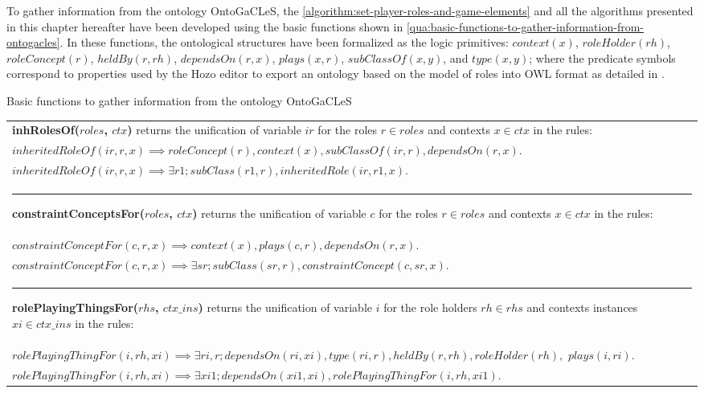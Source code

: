 To gather information from the ontology OntoGaCLeS, the \autoref{algorithm:set-player-roles-and-game-elements} and all the algorithms presented in this chapter hereafter have been developed using the basic functions shown in \autoref{qua:basic-functions-to-gather-information-from-ontogacles}.
In these functions, the ontological structures have been formalized as the logic primitives: $context(x)$, $roleHolder(rh)$, $roleConcept(r)$, $heldBy(r,rh)$, $dependsOn(r,x)$, $plays(x,r)$, $subClassOf(x,y)$, and $type(x,y)$; where the predicate symbols correspond to properties used by the Hozo editor to export an ontology based on the model of roles into OWL format as detailed in \cite{KozakiSunagawaKitamuraMizoguchi2007}.

\begin{quadro}[htb]
\caption{Basic functions to gather information from the ontology OntoGaCLeS}
\label{qua:basic-functions-to-gather-information-from-ontogacles}
\centering
\footnotesize
\begin{tabular}{|p{15cm}|}

\toprule
\textbf{inhRolesOf($roles$, $ctx$)} returns the unification of variable $ir$ for the roles $r \in roles$ and contexts $x \in ctx$ in the rules:  \\
$inheritedRoleOf(ir,r,x) \implies roleConcept(r), context(x), subClassOf(ir,r), dependsOn(r,x).$\\
$inheritedRoleOf(ir,r,x) \implies \exists r1; subClass(r1,r), inheritedRole(ir,r1,x).$\\

\hrule
\textbf{constraintConceptsFor($roles$, $ctx$)} returns the unification of variable $c$ for the roles $r \in roles$ and contexts $x \in ctx$ in the rules:\\
$constraintConceptFor(c,r,x) \implies context(x), plays(c,r), dependsOn(r,x).$\\
$constraintConceptFor(c,r,x) \implies \exists sr; subClass(sr,r), constraintConcept(c,sr,x).$\\

\hrule
\textbf{rolePlayingThingsFor($rhs$, $ctx\_ins$)} returns the unification of variable $i$ for the role holders $rh \in rhs$ and contexts instances $xi \in ctx\_ins$ in the rules:\\
$rolePlayingThingFor(i,rh,xi) \implies \exists ri,r; dependsOn(ri,xi), type(ri,r), heldBy(r,rh), roleHolder(rh),$ $plays(i,ri).$\\
$rolePlayingThingFor(i,rh,xi) \implies \exists xi1; dependsOn(xi1, xi), rolePlayingThingFor(i,rh,xi1).$\\



\end{tabular}
\end{quadro}
